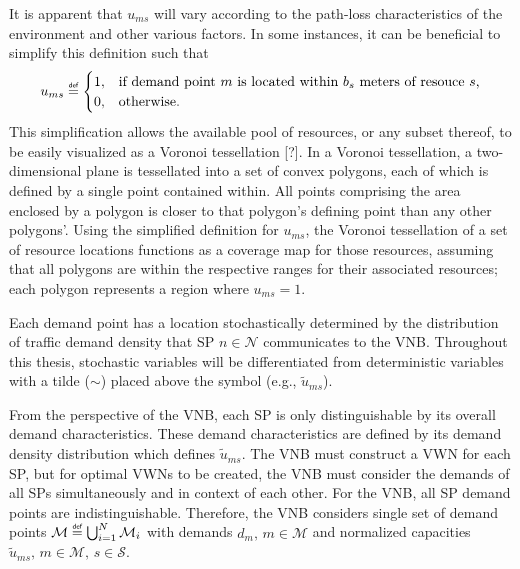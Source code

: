 \documentclass[12pt,dvipsnames]{report}
\newcommand\defeq{\mathrel{\overset{\makebox[0pt]{\mbox{\normalfont\tiny\sffamily def}}}{=}}}
\begin{document}
%
It is apparent that $u_{ms}$ will vary according to the path-loss characteristics of the environment and other various factors.  In some instances, it can be beneficial to simplify this definition such that
\begin{equation}
u_{ms} \defeq
	\begin{cases}
		1,& \text{if demand point $m$ is located within $b_s$ meters of resouce $s$,}\\
		0,& \text{otherwise.}
	\end{cases}
\end{equation} \label{eq:ums_simp}
\noindent This simplification allows the available pool of resources, or any subset thereof, to be easily visualized as a Voronoi tessellation [?].  In a Voronoi tessellation, a two-dimensional plane is tessellated into a set of convex polygons, each of which is defined by a single point contained within.  All points comprising the area enclosed by a polygon is closer to that polygon's defining point than any other polygons'.  Using the simplified definition for $u_{ms}$, the Voronoi tessellation of a set of resource locations functions as a coverage map for those resources, assuming that all polygons are within the respective ranges for their associated resources; each polygon represents a region where $u_{ms} = 1$.

%
Each demand point has a location stochastically determined by the distribution of traffic demand density that SP $n \in \mathcal{N}$ communicates to the VNB.  Throughout this thesis, stochastic variables will be differentiated from deterministic variables with a tilde ($\sim$) placed above the symbol (e.g., $\tilde{u}_{ms}$).

From the perspective of the VNB, each SP is only distinguishable by its overall demand characteristics.  These demand characteristics are defined by its demand density distribution which defines $\tilde{u}_{ms}$.  The VNB must construct a VWN for each SP, but for optimal VWNs to be created, the VNB must consider the demands of all SPs simultaneously and in context of each other.  For the VNB, all SP demand points are indistinguishable.  Therefore, the VNB considers  single set of demand points $\mathcal{M} \defeq \bigcup_{i=1}^{N} \mathcal{M}_i$ with demands $d_m,\, m \in \mathcal{M}$ and normalized capacities $\tilde{u}_{ms},\, m \in \mathcal{M},\, s \in \mathcal{S}$.
\end{document}

